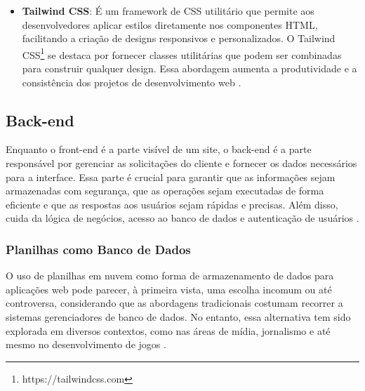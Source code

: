 \begin{itemize}
\begin{itemize}
        \item \textbf{Next.js}: É um \textit{framework} \textit{React} de código aberto hospedado no \textit{GitHub} sob a licença MIT, com foco em produção e eficiência, criado e mantido pela equipe da \textit{Vercel} \cite{nextjs2025}. O Next.js\footnote{https://nextjs.org} tem se destacado por sua capacidade de renderização no lado servidor (SSR), melhorando significativamente o tempo de carregamento das páginas e a otimização para motores de busca \cite{RenanNextjs2024}. Ademais, oferece recursos como geração de site estático (SSG), roteamento baseado em sistema de arquivos, suporte a CSS e SASS incorporados, além de suportar TypeScript. Sua flexibilidade permite que os desenvolvedores escolham entre SSR, SSG ou uma combinação de ambos, dependendo das necessidades do projeto \cite{RenanNextjs2024}.
    \end{itemize}
    \item \textbf{Tailwind CSS}: É um framework de CSS utilitário que permite aos desenvolvedores aplicar estilos diretamente nos componentes HTML, facilitando a criação de designs responsivos e personalizados. O Tailwind CSS\footnote{https://tailwindcss.com} se destaca por fornecer classes utilitárias que podem ser combinadas para construir qualquer design. Essa abordagem aumenta a produtividade e a consistência dos projetos de desenvolvimento web \cite{bosco2024crefide}.
\end{itemize}

\subsection{Back-end}

Enquanto o front-end é a parte visível de um site, o back-end é a parte responsável por gerenciar as solicitações do cliente e fornecer os dados necessários para a interface. Essa parte é crucial para garantir que as informações sejam armazenadas com segurança, que as operações sejam executadas de forma eficiente e que as respostas aos usuários sejam rápidas e precisas. Além disso, cuida da lógica de negócios, acesso ao banco de dados e autenticação de usuários \cite{garcia2024plataforma}.

\subsubsection{Planilhas como Banco de Dados}

O uso de planilhas em nuvem como forma de armazenamento de dados para aplicações web pode parecer, à primeira vista, uma escolha incomum ou até controversa, considerando que as abordagens tradicionais costumam recorrer a sistemas gerenciadores de banco de dados. No entanto, essa alternativa tem sido explorada em diversos contextos, como nas áreas de mídia, jornalismo e até mesmo no desenvolvimento de jogos \cite{schwertnercharao:hal-02119998}.

